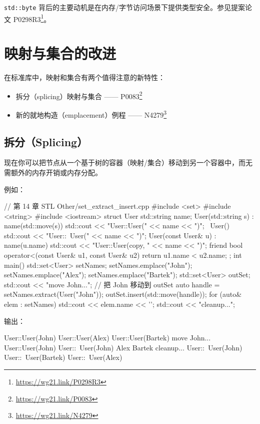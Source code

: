 \texttt{std::byte} 背后的主要动机是在内存/字节访问场景下提供类型安全。参见提案论文 P0298R3\footnote{\url{https://wg21.link/P0298R3}}。


\section{映射与集合的改进}

在标准库中，映射和集合有两个值得注意的新特性：

\begin{itemize}
\item 拆分（splicing）映射与集合 —— P0083\footnote{\url{https://wg21.link/P0083}}
\item 新的就地构造（emplacement）例程 —— N4279\footnote{\url{https://wg21.link/N4279}}
\end{itemize}


\subsection{拆分（Splicing）}

现在你可以把节点从一个基于树的容器（映射/集合）移动到另一个容器中，而无需额外的内存开销或内存分配。

例如：

\begin{codebox}[cpp]
// 第 14 章 STL Other/set_extract_insert.cpp
#include <set>
#include <string>
#include <iostream>
struct User {
std::string name;
User(std::string s) : name(std::move(s)) {
std::cout << "User::User(" << name << ")\n";
}
~User() {
std::cout << "User::~User(" << name << ")\n";
}
User(const User& u) : name(u.name) {
std::cout << "User::User(copy, " << name << ")\n";
}
friend bool operator<(const User& u1, const User& u2) {
return u1.name < u2.name;
}
};
int main() {
std::set<User> setNames;
setNames.emplace("John");
setNames.emplace("Alex");
setNames.emplace("Bartek");
std::set<User> outSet;
std::cout << "move John...\n";
// 把 John 移动到 outSet
auto handle = setNames.extract(User("John"));
outSet.insert(std::move(handle));
for (auto& elem : setNames)
std::cout << elem.name << '\n';
std::cout << "cleanup...\n";
}
\end{codebox}

输出：

\begin{codebox}
User::User(John)
User::User(Alex)
User::User(Bartek)
move John...
User::User(John)
User::~User(John)
Alex
Bartek
cleanup...
User::~User(John)
User::~User(Bartek)
User::~User(Alex)
\end{codebox}

